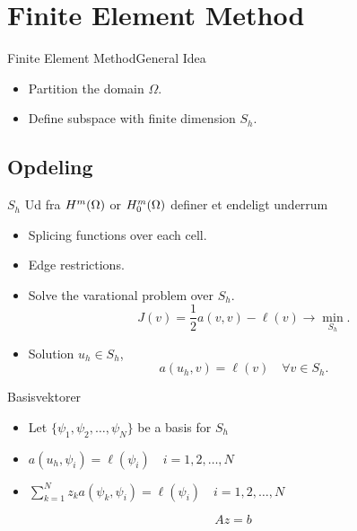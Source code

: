 
\section{Finite Element Method}
\begin{frame}{Finite Element Method}{General Idea}
    \begin{itemize}
        \item Partition the domain $\Omega$.
        \item Define subspace with finite dimension $S_h$.
    \end{itemize}
\end{frame}
\subsection{Opdeling}
\begin{frame}{$S_h$}{}
    Ud fra $H^m(\Omega)$ or $H^m_0(\Omega)$ definer et endeligt underrum

    \begin{itemize}
        \item Splicing functions over each cell.
        \item Edge restrictions.
        \item Solve the varational problem over $S_h$.
        \begin{equation}
            J(v) = \frac{1}{2} a(v,v) - \ell(v) \rightarrow \min_{S_h}.
        \end{equation}
        \item Solution $u_h \in S_h$,
        \begin{equation}
            a(u_h,v) = \ell(v) \quad \forall v \in S_h.
        \end{equation}
    \end{itemize}
\end{frame}
\begin{frame}{Basisvektorer}
   \begin{itemize}
    \item Let $ \{ \psi_1, \psi_2, \ldots, \psi_N \}$ be a basis for $S_h$ 
    \item $ a(u_h, \psi_i) = \ell(\psi_i) \quad i = 1, 2, \ldots, N $ 
    \item $\sum_{k=1}^N z_k a(\psi_k,\psi_i) = \ell(\psi_i) \quad i = 1,2,\ldots,N $
   \end{itemize} 
   \begin{equation*}
    Az = b
   \end{equation*}
\end{frame}
